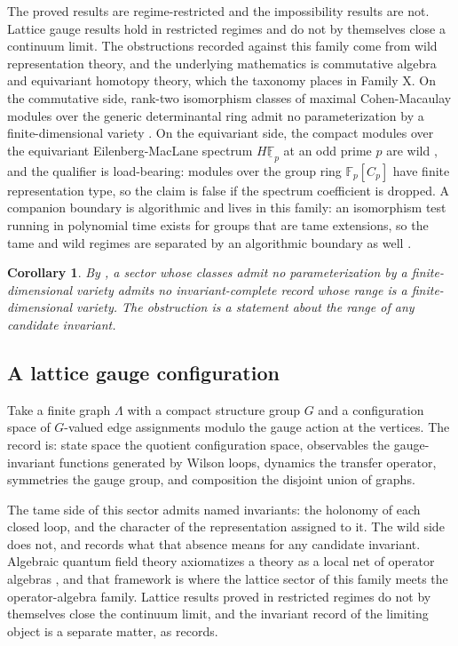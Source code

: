 \documentclass[11pt,letterpaper]{article}
\newtheorem{corollary}[theorem]{Corollary}
\theoremstyle{definition}
\theoremstyle{remark}
\begin{document}
The proved results are regime-restricted and the impossibility results are not. Lattice gauge results hold in restricted regimes and do not by themselves close a continuum limit. The obstructions recorded against this family come from wild representation theory, and the underlying mathematics is commutative algebra and equivariant homotopy theory, which the taxonomy places in Family X. On the commutative side, rank-two isomorphism classes of maximal Cohen-Macaulay modules over the generic determinantal ring admit no parameterization by a finite-dimensional variety \cite{buchweitz}. On the equivariant side, the compact modules over the equivariant Eilenberg-MacLane spectrum $H\underline{\mathbb{F}}_p$ at an odd prime $p$ are wild \cite{grevstad}, and the qualifier is load-bearing: modules over the group ring $\mathbb{F}_p[C_p]$ have finite representation type, so the claim is false if the spectrum coefficient is dropped. A companion boundary is algorithmic and lives in this family: an isomorphism test running in polynomial time exists for groups that are tame extensions, so the tame and wild regimes are separated by an algorithmic boundary as well \cite{grochow}.

\begin{corollary}
\label{cor:wild}
By , a sector whose classes admit no parameterization by a finite-dimensional variety admits no invariant-complete record whose range is a finite-dimensional variety. The obstruction is a statement about the range of any candidate invariant.
\end{corollary}

\subsection{A lattice gauge configuration}
\label{sec:lattice}

Take a finite graph $\Lambda$ with a compact structure group $G$ and a configuration space of $G$-valued edge assignments modulo the gauge action at the vertices. The record is: state space the quotient configuration space, observables the gauge-invariant functions generated by Wilson loops, dynamics the transfer operator, symmetries the gauge group, and composition the disjoint union of graphs.

The tame side of this sector admits named invariants: the holonomy of each closed loop, and the character of the representation assigned to it. The wild side does not, and  records what that absence means for any candidate invariant. Algebraic quantum field theory axiomatizes a theory as a local net of operator algebras \cite{haagkastler}, and that framework is where the lattice sector of this family meets the operator-algebra family. Lattice results proved in restricted regimes do not by themselves close the continuum limit, and the invariant record of the limiting object is a separate matter, as  records.
\end{document}

